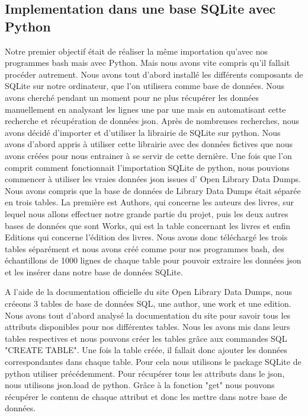 \documentclass[12pt, a4paper]{article}
\begin{document}
\subsection{Implementation dans une base SQLite avec Python}
Notre premier objectif était de réaliser la même importation qu'avec nos programmes bash mais avec Python. Mais nous avons vite compris qu'il fallait procéder autrement. Nous avons tout d'abord installé les différents composants de SQLite sur notre ordinateur, que l'on utilisera comme base de données. Nous avons cherché pendant un moment pour ne plus récupérer les données manuellement en analysant les lignes une par une mais en automatisant cette recherche  et récupération de données json. Après de nombreuses recherches, nous avons décidé d'importer et d'utiliser la librairie de SQLite sur python. Nous avons d'abord appris à utiliser cette librairie avec des données fictives que nous avons créées pour nous entrainer à se servir de cette dernière. Une fois que l'on comprit comment fonctionnait l'importation SQLite de python, nous pouvions commencer à utiliser les vraies données json issues d' Open Library Data Dumps. Nous avons compris que la base de données de Library Data Dumps était séparée en trois tables. La première est Authors, qui concerne les auteurs des livres, sur lequel nous allons effectuer notre grande partie du projet, puis les deux autres bases de données que sont Works, qui est la table concernant les livres et enfin Editions qui concerne l'édition des livres. Nous avons donc téléchargé les trois tables séparément et nous avons créé comme pour nos programmes bash, des échantillons de 1000 lignes de chaque table pour pouvoir extraire les données json et les insérer dans notre base de données SQLite.

A l'aide de la documentation officielle du site Open Library Data Dumps, nous créeons 3 tables de base de données SQL, une author, une work et une edition. Nous avons tout d'abord analysé la documentation du site pour savoir tous les attributs disponibles pour nos différentes tables. Nous les avons mis dans leurs tables respectives et nous pouvons créer les tables grâce aux commandes SQL "CREATE TABLE". Une fois la table créée, il fallait donc ajouter les données correspondantes dans chaque table. Pour cela nous utilisons le package SQLite de python utiliser précédemment. Pour récupérer tous les attributs dans le json, nous utilisons json.load de python. Grâce à la fonction "get" nous pouvons récupérer le contenu de chaque attribut et donc les mettre dans notre base de données. 
\end{document}
